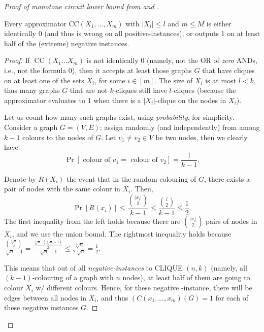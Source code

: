 \begin{proof}[Proof of  monotone circuit lower bound from  and ]
\

\begin{claim}\label{cla:}
 Every approximator  CC$\left(X_1, \ldots, X_m\right)$ with 
  $\left|X_i\right| \leq l$ and $m \leq M$ is either identically 0 (and thus is wrong on all positive-instances), or outputs 1 on at least half of the (extreme) negative instances.
\end{claim}
\begin{proof}
If $\operatorname{CC}\left(X_1 \ldots X_m\right)$ is not identically 0 (namely, not the OR of \emph{zero} ANDs, i.e., not the formula $0$), then it accepts at least those graphs $G$ that have cliques on at least one of the sets $X_i$, for some $i\in[m]$. The size of $X_i$ is at most $ l<k$, thus many graphs $G$ that are not $k$-cliques still have $l$-cliques (because the approximator evaluates to 1 when there is a $|X_i|$-clique on the nodes in $X_i$).

Let us  count how many such graphs exist, using \emph{probability}, for simplicity. Consider a graph $G=(V, E)$; assign randomly (and independently) from among $k-1$ colours to the nodes of $G$. Let $v_1 \neq v_2 \in V$ be two nodes, then we clearly have
$$
\operatorname{Pr}\left[\text { colour of } v_1=\text { colour of } v_2\right]=\frac{1}{k-1}.
$$


Denote by $R\left(X_i\right)$ the event that in the random colouring of $G$, there exists a pair of nodes with the same colour in $X_i$.
Then, 
$$
\operatorname{Pr}\left[R\left(x_i\right)\right] \leq \frac{\binom{|x_i |}{2}}{k-1} \leq \frac{\binom{l}{2}}{k-1} \leq \frac{1}{2}.
$$
The first inequality from the left holds because there are $\binom{\mid x_i |}{2}$ pairs
of nodes in $X_i$, and we use
the union bound.
The rightmost inequality holds because 
$ \frac{\binom{\sqrt[8]{n}}{2}}{\sqrt[4]{n}-1}
= \frac{\frac{\sqrt[8]{n} \cdot(\sqrt[8]{n}-1)}{2}}{\sqrt[4]{n}-1} \le \frac{\sqrt[4]{n}}{2\sqrt[4]{n}}=\frac{1}{2}.
$



This means that out of all \emph{negative-instances} to CLIQUE $(n, k)$ (namely, all $(k-1)$-colouring of a graph with $n$ nodes), at least half of them are going to colour $X_i$ w/ different colours. Hence, for these negative -instance, there will be edges between all nodes in $X_i$, and thus $\left(C\left(x_1, \ldots, x_m\right)(G)=1\right.$ for each of these negative instances $G$.
\end{proof}





\end{proof}
